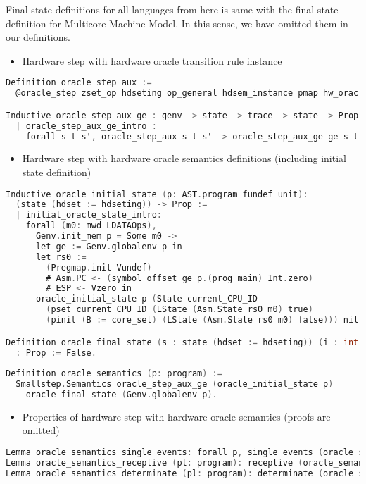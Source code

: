 Final state definitions for all languages from here is same with the final state definition for Multicore Machine Model. In this sense, 
we have omitted them in our definitions. 

\begin{itemize}[leftmargin=*]
\item Hardware step with hardware oracle transition rule instance
\end{itemize}
\begin{lstlisting}[language=C]
Definition oracle_step_aux :=
  @oracle_step zset_op hdseting op_general hdsem_instance pmap hw_oracle.

Inductive oracle_step_aux_ge : genv -> state -> trace -> state -> Prop :=
  | oracle_step_aux_ge_intro : 
    forall s t s', oracle_step_aux s t s' -> oracle_step_aux_ge ge s t s'.
\end{lstlisting}

\begin{itemize}[leftmargin=*]
\item Hardware step with hardware oracle semantics definitions (including initial state definition)
\end{itemize}
\begin{lstlisting}[language=C]
Inductive oracle_initial_state (p: AST.program fundef unit): 
  (state (hdset := hdseting)) -> Prop := 
  | initial_oracle_state_intro: 
    forall (m0: mwd LDATAOps),
      Genv.init_mem p = Some m0 ->
      let ge := Genv.globalenv p in
      let rs0 :=
        (Pregmap.init Vundef)
        # Asm.PC <- (symbol_offset ge p.(prog_main) Int.zero)
        # ESP <- Vzero in
      oracle_initial_state p (State current_CPU_ID 
        (pset current_CPU_ID (LState (Asm.State rs0 m0) true)
        (pinit (B := core_set) (LState (Asm.State rs0 m0) false))) nil).

Definition oracle_final_state (s : state (hdset := hdseting)) (i : int)
  : Prop := False.
      
Definition oracle_semantics (p: program) :=
  Smallstep.Semantics oracle_step_aux_ge (oracle_initial_state p) 
    oracle_final_state (Genv.globalenv p). 
\end{lstlisting}

\begin{itemize}[leftmargin=*]
\item Properties of hardware step with hardware oracle semantics (proofs are omitted)
\end{itemize}
\begin{lstlisting}[language=C]
Lemma oracle_semantics_single_events: forall p, single_events (oracle_semantics p).
Lemma oracle_semantics_receptive (pl: program): receptive (oracle_semantics pl).
Lemma oracle_semantics_determinate (pl: program): determinate (oracle_semantics pl).
\end{lstlisting}

